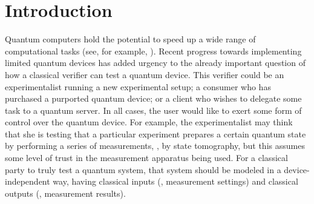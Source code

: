 \documentclass{toc}
\begin{document}
\begin{frontmatter} [classification=text]
\begin{abstract}
Our main technical innovation is an efficient rigidity theorem that allows a verifier to test that two entangled provers perform measurements specified by an arbitrary $m$-qubit tensor product of single-qubit Clifford observables on their respective halves of $m$ shared EPR pairs, with a robustness that is independent of $m$. Our two-prover classical-verifier delegation protocols are obtained by combining this rigidity theorem with a single-prover quantum-verifier protocol for the verifiable delegation of a quantum computation, introduced by Broadbent
\href{https://doi.org/10.4086/toc.2018.v014a011}{(Theory of Computing, 2018)}. 
\end{abstract}  %

\end{frontmatter}


\section{Introduction}

Quantum computers hold the potential to speed up a wide range of computational tasks (see, for example, \cite{montanaro2016survey}). Recent progress towards implementing limited quantum devices has added urgency to the already important question of how a classical verifier can test a quantum device. This verifier could be an experimentalist running a new experimental setup; a consumer who has purchased a purported quantum device; or a client who wishes to delegate some task to a quantum server. In all cases, the user would like to exert some form of control over the quantum device. For example, the experimentalist may think that she is testing that a particular experiment prepares a certain quantum state by performing a series of measurements, \ie, by state tomography, but this assumes some level of trust in the measurement apparatus being used.  For a classical party to truly test a quantum system, that system should be modeled in a device-independent way, having classical inputs (\eg, measurement settings) and classical outputs (\eg, measurement results). 
\end{document}
